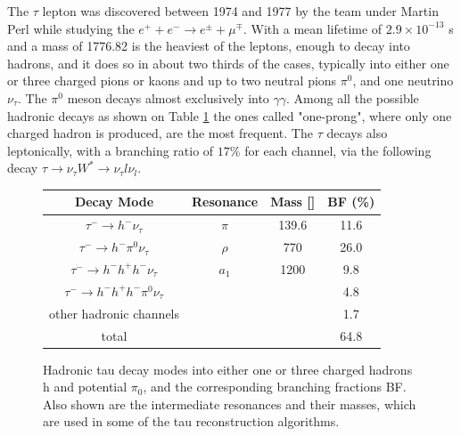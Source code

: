 
The $\tau$ lepton was discovered between 1974 and 1977 by the team under Martin Perl while studying the $e^{+}+e^{-}\longrightarrow e^{\pm}+\mu^{\mp}$. With a mean lifetime of $2.9\times10^{−13}$ s and a mass of 1776.82 \mev \cite{Agashe:2014kda} is the heaviest of the leptons, enough to decay into hadrons, and it does so in about two thirds of the cases, typically into either one or three charged pions or kaons and up to two neutral pions \ensuremath{\pi^{0}}, and one neutrino \ensuremath{\nu_{\tau}}. The \ensuremath{\pi^{0}} meson decays almost exclusively into \ensuremath{\gamma\gamma}. Among all the possible hadronic decays as shown on Table \ref{table:tau_hdecay} the ones called "one-prong", where only one charged hadron is produced, are the most frequent. The $\tau$ decays also leptonically, with a branching ratio of $17\%$ for each channel, via the following decay $\tau\longrightarrow\nu_{\tau}W^{*}\longrightarrow\nu_{\tau}l\nu_{l}$.

\begin{figure}[tbh!]
	\begin{center}	
		\begin{tabular}{ | c | c | c | c |}
			\hline
			Decay Mode & Resonance & Mass [\mev] & BF (\%) \\ \hline
			\hline
			$\tau^{-}\longrightarrow h^{-}\nu_{\tau}$& $\pi$ & 139.6 & 11.6 \\ \hline
			$\tau^{-}\longrightarrow h^{-}\pi^{0}\nu_{\tau}$& $\rho$ & 770 & 26.0 \\ \hline
			$\tau^{-}\longrightarrow h^{-} h^{+} h^{-} \nu_{\tau}$& $a_{1}$& 1200 & 9.8 \\ \hline
			$\tau^{-}\longrightarrow h^{-} h^{+} h^{-} \pi^{0}\nu_{\tau}$& & & 4.8 \\ \hline
			other hadronic channels& & & 1.7 \\ \hline
			\hline
			total & & & 64.8 \\ \hline
			\hline
		\end{tabular}
		\caption{ Hadronic tau decay modes into either one or three charged hadrons h and potential $\pi_{0}$, and the corresponding branching fractions BF. Also shown are the intermediate resonances and their masses, which are used in some of the tau reconstruction algorithms.}
		\label{table:tau_hdecay}
	\end{center}
\end{figure}


